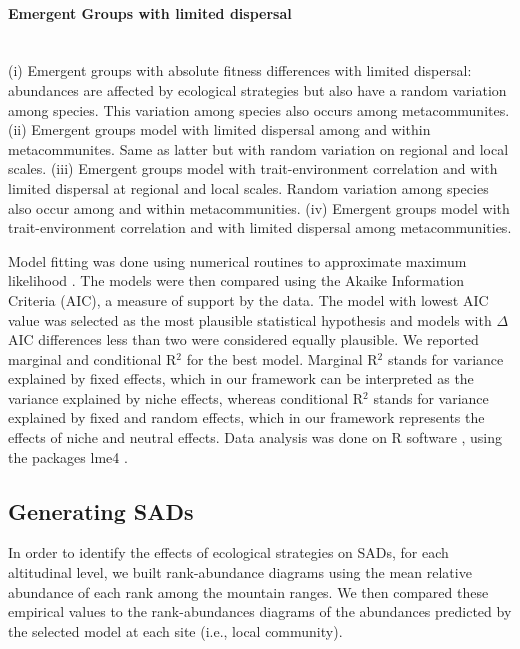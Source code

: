 \documentclass[12pt]{article}
\begin{document}
\begin{mdframed}[style=exampledefault]
\begin{singlespacing}
\paragraph{{\color{nineu}{$\blacksquare$}} Emergent Groups with limited dispersal} ~\\ (i) Emergent groups with absolute fitness differences with limited dispersal: 
abundances are affected by ecological strategies but also have a random variation among species. This variation among species also occurs among metacommunites. 
(ii) Emergent groups model with limited dispersal among and within metacommunites. %
Same as latter but with random variation on regional and local scales.  
(iii) Emergent groups model with trait-environment correlation and with limited dispersal at regional and local scales. Random variation among species also occur among and within metacommunities.
(iv) Emergent groups model with trait-environment correlation and with limited dispersal among metacommunities. 

\end{singlespacing}

\end{mdframed}

Model fitting was done using numerical routines to approximate maximum
likelihood \citep{Bates2013}. The models were then compared using the
Akaike Information Criteria (AIC), a measure of support by the data. 
The model with lowest AIC value was selected as the most plausible
statistical hypothesis and models with {$\Delta$}AIC differences less
than two were considered equally plausible. We reported marginal and conditional R${^2}$ \citep{Nakagawa2013} for the best model. Marginal R${^2}$ stands for variance explained by fixed effects, which in our framework can be interpreted as the variance explained by niche effects, whereas conditional R${^2}$ stands for variance explained by fixed and random effects, which in our framework represents the effects of niche and neutral effects.  
Data analysis was done on R software \citep{RCoreDevelopmentTeam2009}, using the packages lme4 \citep{Bates2013}.

\subsection*{Generating SADs}

In order to identify the effects of ecological strategies on SADs, for each altitudinal level, we built rank-abundance diagrams using the mean relative abundance of each rank among the mountain ranges. We then compared these empirical
values to the rank-abundances diagrams of the abundances predicted by the selected model at each site (i.e., local community). 
\end{document}
